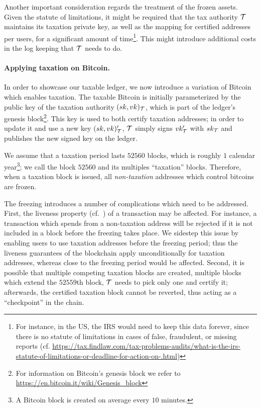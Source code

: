 Another important consideration regards the treatment of the frozen assets.
Given the statute of limitations, it might be required that the tax authority
$\mathcal{T}$ maintains its taxation private key, as well as the mapping for
certified addresses per users, for a significant amount of time\footnote{For
instance, in the US, the IRS would need to keep this data forever, since there
is no statute of limitations in cases of false, fraudulent, or missing reports
(cf.
\url{https://tax.findlaw.com/tax-problems-audits/what-is-the-irs-statute-of-limitations-or-deadline-for-action-on-.html})}.
This might introduce additional costs in the log keeping that $\mathcal{T}$ needs
to do.

\paragraph{Applying taxation on Bitcoin.}

In order to showcase our taxable ledger, we now introduce a variation of
Bitcoin which enables taxation. The taxable Bitcoin is initially parameterized
by the public key of the taxation authority $(sk, vk)_\mathcal{T}$, which is part
of the ledger's genesis block\footnote{For information on Bitcoin's genesis
block we refer to \url{https://en.bitcoin.it/wiki/Genesis_block}}. This key is
used to both certify taxation addresses; in order to update it and use a new
key $(sk, vk)_\mathcal{T}'$, $\mathcal{T}$ simply signs $vk_\mathcal{T}'$ with
$sk_\mathcal{T}$ and publishes the new signed key on the ledger.

We assume that a taxation period lasts $52560$ blocks, which is roughly $1$
calendar year\footnote{A Bitcoin block is created on average every $10$
minutes.}; we call the block $52560$ and its multiples ``taxation'' blocks.
Therefore, when a taxation block is issued, all \emph{non-taxation} addresses
which control bitcoins are frozen.

The freezing introduces a number of complications which need to be addressed.
First, the liveness property (cf.~\cite{EC:GarKiaLeo15}) of a transaction may
be affected. For instance, a transaction which spends from a non-taxation
address will be rejected if it is not included in a block before the freezing
takes place. We sidestep this issue by enabling users to use taxation addresses
before the freezing period; thus the liveness guarantees of the blockchain
apply unconditionally for taxation addresses, whereas close to the freezing
period would be affected. Second, it is possible that multiple competing
taxation blocks are created, \eg multiple blocks which extend the $52559$th
block, $\mathcal{T}$ needs to pick only one and certify it; afterwards, the
certified taxation block cannot be reverted, thus acting as a ``checkpoint'' in
the chain.

